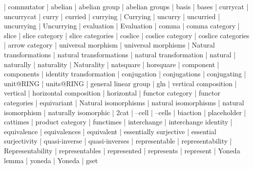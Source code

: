     |   commutator
    |   abelian
    |   abelian group
    |   abelian groups
    |   basis
    |   bases
    |   currycat
    |   uncurrycat
    |   curry
    |   curried
    |   currying
    |   Currying
    |   uncurry
    |   uncurried
    |   uncurrying
    |   Uncurrying
    |   evaluation
    |   Evaluation
    |   comma
    |   comma category
    |   slice
    |   slice category
    |   slice categories
    |   coslice
    |   coslice category
    |   coslice categories
    |   arrow category
    |   universal morphism
    |   universal morphisms
    |   Natural transformations
    |   natural transformations
    |   natural transformation
    |   natural
    |   naturally
    |   naturality
    |   Naturality
    |   natsquare
    |   horsquare
    |   component
    |   components
    |   identity transformation
    |   conjugation
    |   conjugations
    |   conjugating
    |   unit@RING
    |   units@RING
    |   general linear group
    |   gln
    |   vertical composition
    |   vertical
    |   horizontal composition
    |   horizontal
    |   functor category
    |   functor categories
    |   equivariant
    |   Natural isomorphisms
    |   natural isomorphisms
    |   natural isomorphism
    |   naturally isomorphic
    |   2cat
    |   --cell
    |   --cells
    |   biaction
    |   placeholder
    |   cattimes
    |   product category
    |   functimes
    |   interchange
    |   interchange identity
    |   equivalence
    |   equivalences
    |   equivalent
    |   essentially surjective
    |   essential surjectivity
    |   quasi-inverse
    |   quasi-inverses
    |   representable
    |   representability
    |   Representability
    |   representables
    |   represented
    |   represents
    |   represent
    |   Yoneda lemma
    |   yoneda
    |   Yoneda
    |   gset
